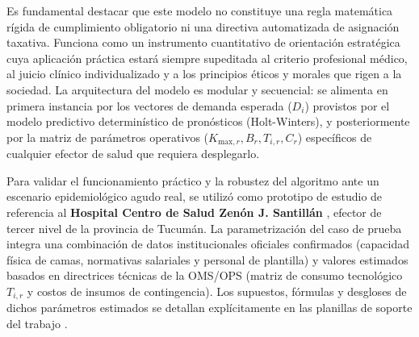 \documentclass[conference]{IEEEtran}
\begin{document}
Es fundamental destacar que este modelo no constituye una regla matemática rígida de cumplimiento obligatorio ni una directiva automatizada de asignación taxativa. Funciona como un instrumento cuantitativo de orientación estratégica cuya aplicación práctica estará siempre supeditada al criterio profesional médico, al juicio clínico individualizado y a los principios éticos y morales que rigen a la sociedad. La arquitectura del modelo es modular y secuencial: se alimenta en primera instancia por los vectores de demanda esperada ($D_i$) provistos por el modelo predictivo determinístico de pronósticos (Holt-Winters), y posteriormente por la matriz de parámetros operativos ($K_{\text{max},r}, B_r, T_{i,r}, C_r$) específicos de cualquier efector de salud que requiera desplegarlo.

Para validar el funcionamiento práctico y la robustez del algoritmo ante un escenario epidemiológico agudo real, se utilizó como prototipo de estudio de referencia al \textbf{Hospital Centro de Salud Zenón J. Santillán} \cite{refMSPT2}, efector de tercer nivel de la provincia de Tucumán. La parametrización del caso de prueba integra una combinación de datos institucionales oficiales confirmados (capacidad física de camas, normativas salariales y personal de plantilla) y valores estimados basados en directrices técnicas de la OMS/OPS (matriz de consumo tecnológico $T_{i,r}$ y costos de insumos de contingencia). Los supuestos, fórmulas y desgloses de dichos parámetros estimados se detallan explícitamente en las planillas de soporte del trabajo \cite{refGP}.
\end{document}
